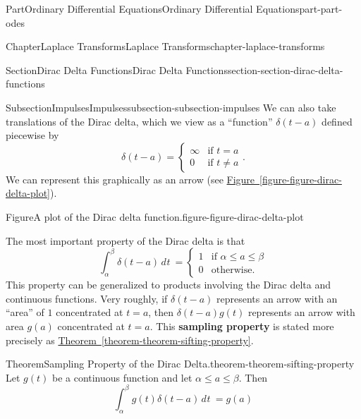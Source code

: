 \documentclass[twoside,10pt,]{book}
\newcommand{\xreffont}{\relax}
\newcommand{\terminology}[1]{\textbf{#1}}
\numberwithin{equation}{part}
\newcommand{\dd}[2][]{\, d^{#1} #2\ }
\newcommand{\amp}{&}
\begin{document}
\begin{partptx}{Part}{Ordinary Differential Equations}{}{Ordinary Differential Equations}{}{}{part-part-odes}
\begin{chapterptx}{Chapter}{Laplace Transforms}{}{Laplace Transforms}{}{}{chapter-laplace-transforms}
\begin{sectionptx}{Section}{Dirac Delta Functions}{}{Dirac Delta Functions}{}{}{section-section-dirac-delta-functions}
\begin{subsectionptx}{Subsection}{Impulses}{}{Impulses}{}{}{subsection-subsection-impulses}
We can also take translations of the Dirac delta, which we view as a ``function'' \(\delta(t-a)\) defined piecewise by%
\begin{equation*}
\delta(t-a)=
\begin{cases}
\infty \amp\text{if }t=a\\
0 \amp\text{if }t\neq a
\end{cases}.
\end{equation*}
We can represent this graphically as an arrow (see \hyperref[figure-figure-dirac-delta-plot]{Figure~{\xreffont\ref{figure-figure-dirac-delta-plot}}}).%
\begin{figureptx}{Figure}{A plot of the Dirac delta function.}{figure-figure-dirac-delta-plot}{}%
\begin{image}{0.2}{0.6}{0.2}{}%
%
\end{image}%
\tcblower
\end{figureptx}%
The most important property of the Dirac delta is that%
\begin{equation*}
\int_{\alpha}^{\beta}\delta(t-a)\dd{t} = 
\begin{cases}
1 \amp\text{if }\alpha\leq a\leq\beta \\
0 \amp\text{otherwise.}  
\end{cases}
\end{equation*}
This property can be generalized to products involving the Dirac delta and continuous functions. Very roughly, if \(\delta(t - a)\) represents an arrow with an ``area'' of \(1\) concentrated at \(t = a\), then \(\delta(t - a)g(t)\) represents an arrow with area \(g(a)\) concentrated at \(t = a\). This \terminology{sampling property} is stated more precisely as \hyperref[theorem-theorem-sifting-property]{Theorem~{\xreffont\ref{theorem-theorem-sifting-property}}}.%
\begin{theorem}{Theorem}{Sampling Property of the Dirac Delta.}{}{theorem-theorem-sifting-property}%
%
Let \(g(t)\) be a continuous function and let \(\alpha\leq a\leq\beta\). Then%
\begin{equation*}
\int_{\alpha}^{\beta}g(t)\delta(t-a)\dd{t} = g(a)
\end{equation*}

\end{theorem}
\end{subsectionptx}
\end{sectionptx}
\end{chapterptx}
\end{partptx}
\end{document}
